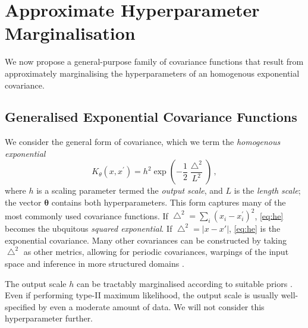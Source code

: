 \documentclass{article}
\begin{document}
\section{Approximate Hyperparameter Marginalisation}

We now propose a general-purpose family of covariance functions that result from approximately marginalising the hyperparameters of an homogenous exponential covariance. 


\subsection{Generalised Exponential Covariance Functions} 

We consider the general form of covariance, which we term the {\it homogenous exponential}
\begin{equation}\label{eq:he}
K_\theta(x,x^\prime) = h^2 \exp \left( -\frac{1}{2} \frac{\bigtriangleup^2}{L^2} \right)\,,
\end{equation}
where $h$ is a scaling parameter termed the \emph{output scale}, and $L$ is the \emph{length scale}; the vector $\bm{\theta}$ contains both hyperparameters. This form captures many of the most commonly used covariance functions. If $\bigtriangleup^2 = \sum_i (x_i - x_i^\prime)^2$, \eqref{eq:he} becomes the ubquitous \emph{squared exponential}. If $\bigtriangleup^2 = |x-x'|$,  \eqref{eq:he} is the exponential covariance. Many other covariances can be constructed by taking $\bigtriangleup^2$ as other metrics, allowing for periodic covariances, warpings of the input space \citep{snelson2004warped} and inference in more structured domains \citep{garnett2010bayesian}.

The output scale $h$ can be tractably marginalised according to suitable priors \citep{kennedy1998bayesian}. Even if performing type-II maximum likelihood, the output scale is usually well-specified by even a moderate amount of data. We will not consider this hyperparameter further. 
\end{document}
